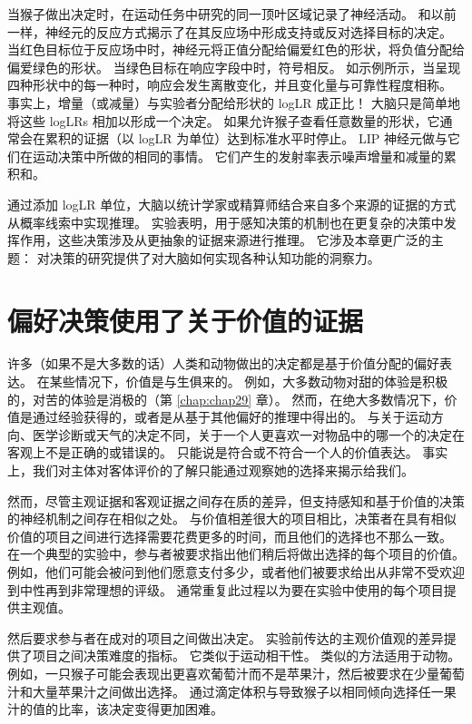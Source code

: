 当猴子做出决定时，在运动任务中研究的同一顶叶区域记录了神经活动。
和以前一样，神经元的反应方式揭示了在其反应场中形成支持或反对选择目标的决定。
当红色目标位于反应场中时，神经元将正值分配给偏爱红色的形状，将负值分配给偏爱绿色的形状。
当绿色目标在响应字段中时，符号相反。
如示例所示，当呈现四种形状中的每一种时，响应会发生离散变化，并且变化量与可靠性程度相称。
事实上，增量（或减量）与实验者分配给形状的 logLR 成正比！
大脑只是简单地将这些 logLRs 相加以形成一个决定。
如果允许猴子查看任意数量的形状，它通常会在累积的证据（以 logLR 为单位）达到标准水平时停止。
LIP 神经元做与它们在运动决策中所做的相同的事情。
它们产生的发射率表示噪声增量和减量的累积和。


通过添加 logLR 单位，大脑以统计学家或精算师结合来自多个来源的证据的方式从概率线索中实现推理。
实验表明，用于感知决策的机制也在更复杂的决策中发挥作用，这些决策涉及从更抽象的证据来源进行推理。
它涉及本章更广泛的主题：
对决策的研究提供了对大脑如何实现各种认知功能的洞察力。



\section{偏好决策使用了关于价值的证据}

许多（如果不是大多数的话）人类和动物做出的决定都是基于价值分配的偏好表达。 
在某些情况下，价值是与生俱来的。
例如，大多数动物对甜的体验是积极的，对苦的体验是消极的（第 \ref{chap:chap29} 章）。
然而，在绝大多数情况下，价值是通过经验获得的，或者是从基于其他偏好的推理中得出的。
与关于运动方向、医学诊断或天气的决定不同，关于一个人更喜欢一对物品中的哪一个的决定在客观上不是正确的或错误的。
只能说是符合或不符合一个人的价值表达。
事实上，我们对主体对客体评价的了解只能通过观察她的选择来揭示给我们。


然而，尽管主观证据和客观证据之间存在质的差异，但支持感知和基于价值的决策的神经机制之间存在相似之处。
与价值相差很大的项目相比，决策者在具有相似价值的项目之间进行选择需要花费更多的时间，而且他们的选择也不那么一致。
在一个典型的实验中，参与者被要求指出他们稍后将做出选择的每个项目的价值。
例如，他们可能会被问到他们愿意支付多少，或者他们被要求给出从非常不受欢迎到中性再到非常理想的评级。
通常重复此过程以为要在实验中使用的每个项目提供主观值。


然后要求参与者在成对的项目之间做出决定。
实验前传达的主观价值观的差异提供了项目之间决策难度的指标。
它类似于运动相干性。
类似的方法适用于动物。
例如，一只猴子可能会表现出更喜欢葡萄汁而不是苹果汁，然后被要求在少量葡萄汁和大量苹果汁之间做出选择。
通过滴定体积与导致猴子以相同倾向选择任一果汁的值的比率，该决定变得更加困难。


